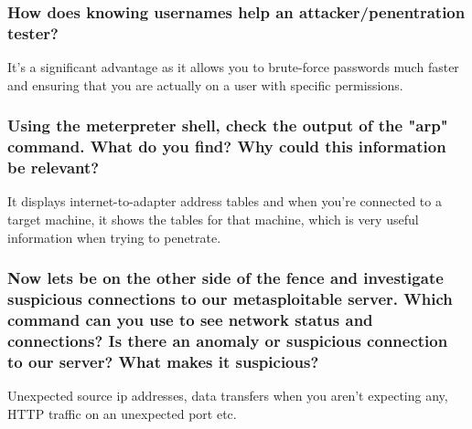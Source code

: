 \subsubsection{How does knowing usernames help an attacker/penentration tester?}
It's a significant advantage as it allows you to brute-force passwords much faster and ensuring that you are actually on a user with specific permissions.

\subsubsection{Using the meterpreter shell, check the output of the "arp" command. What do you find? Why could this information be relevant?
}
It displays internet-to-adapter address tables and when you're connected to a target machine, it shows the tables for that machine, which is very useful information when trying to penetrate.

\subsubsection{Now lets be on the other side of the fence and investigate suspicious connections to our metasploitable server. Which command can you use to see network status and connections? Is there an anomaly or suspicious connection to our server? What makes it suspicious?}
Unexpected source ip addresses, data transfers when you aren't expecting any, HTTP traffic on an unexpected port etc.